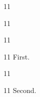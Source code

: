 \documentclass[paper=A4]{ropas-poster}
\begin{document}
\begin{postergrid}{1}{1}
\begin{posterblock}{1}{1}
\begin{postergrid}{1}{1}
\begin{posterblock}{1}{1}
First.
\end{posterblock}
\end{postergrid}\begin{postergrid}{1}{1}
\begin{posterblock}{1}{1}
Second.
\end{posterblock}
\end{postergrid}
\end{posterblock}
\end{postergrid}
\end{document}
